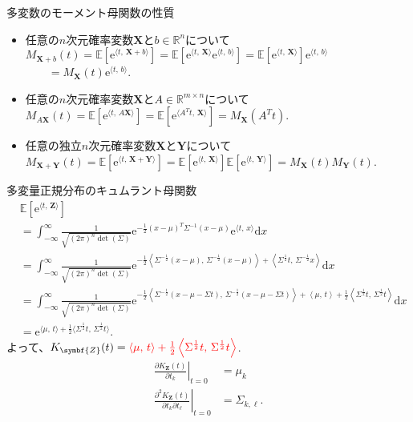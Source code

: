 \documentclass[lualatex,handout]{beamer}
\newcommand{\mycolor}[2]{%
  \begingroup
  \colorlet{currentcolor}{.}%
  \color{#1}#2%
  \color{currentcolor}%
  \endgroup
}
\newcommand{\emm}[1]{\mycolor{red}{#1}}
\newcommand{\expt}[1]{\mathbb{E}\left[#1\right]}
\theoremstyle{definition}
\begin{document}
\begin{frame}{多変数のモーメント母関数の性質}
\small
\begin{itemize}
\setlength{\itemsep}{3em}
\item 任意の$n$次元確率変数$\symbf{X}$と$b\in\mathbb{R}^n$について
$M_{{\symbf{X}}+b}(t) = \expt{\mathrm{e}^{\langle t,\, {\symbf{X}}+b\rangle}} = \expt{\mathrm{e}^{\langle t,\,\symbf{X}\rangle}\mathrm{e}^{\langle t,\,b\rangle}} = \expt{\mathrm{e}^{\langle t,\, {\symbf{X}}\rangle}}\mathrm{e}^{\langle t,\,b\rangle}$\\
$\qquad = M_{\symbf{X}}(t)\mathrm{e}^{\langle t,\, b\rangle}$.
\item 任意の$n$次元確率変数$\symbf{X}$と$A\in\mathbb{R}^{m\times n}$について
$M_{A{\symbf{X}}}(t) = \expt{\mathrm{e}^{\langle t,\, A{\symbf{X}}\rangle}} = \expt{\mathrm{e}^{\langle A^Tt,\, {\symbf{X}}\rangle}} = M_{\symbf{X}}(A^Tt)$.
\item 任意の独立$n$次元確率変数$\symbf{X}$と$\symbf{Y}$について
$M_{{\symbf{X}}+{\symbf{Y}}}(t) = \expt{\mathrm{e}^{\langle t,\, {\symbf{X}}+{\symbf{Y}}\rangle}} = \expt{\mathrm{e}^{\langle t,\, {\symbf{X}}\rangle}}\expt{\mathrm{e}^{\langle t,\, {\symbf{Y}}\rangle}}= M_{\symbf{X}}(t)M_{\symbf{Y}}(t)$.
\end{itemize}
\end{frame}

\begin{frame}{多変量正規分布のキュムラント母関数}
\small
\begin{align*}
&\expt{\mathrm{e}^{\langle t,\,\symbf{Z}\rangle}}\\
&=\int_{-\infty}^\infty \frac1{\sqrt{(2\pi)^n\det(\Sigma)}} \mathrm{e}^{-\frac12 (x-\mu)^T\Sigma^{-1} (x-\mu)}\mathrm{e}^{\langle t,\, x\rangle}\mathrm{d}x\\
&= \int_{-\infty}^\infty \frac1{\sqrt{(2\pi)^n\det(\Sigma)}} \mathrm{e}^{-\frac12 \left\langle\Sigma^{-\frac12}(x-\mu),\,\Sigma^{-\frac12}(x-\mu)\right\rangle+\left\langle \Sigma^{\frac12}t,\, \Sigma^{-\frac12}x\right\rangle}\mathrm{d}x\\
&= \int_{-\infty}^\infty \frac1{\sqrt{(2\pi)^n\det(\Sigma)}} \mathrm{e}^{-\frac12 \left\langle\Sigma^{-\frac12}(x-\mu-\Sigma t),\,\Sigma^{-\frac12}(x-\mu-\Sigma t)\right\rangle +\left\langle \mu,\, t\right\rangle + \frac12\left\langle \Sigma^\frac12t,\,\Sigma^\frac12t\right\rangle}\mathrm{d}x\\
&= \mathrm{e}^{\langle \mu,\, t\rangle + \frac12\langle \Sigma^\frac12t,\,\Sigma^\frac12t\rangle}.
\end{align*}
よって、$K_{\symbf{Z}}(t) = \emm{\langle \mu,\, t\rangle + \frac12\left\langle \Sigma^\frac12t,\,\Sigma^\frac12t\right\rangle}$.
\begin{align*}
\left.\frac{\partial K_{\symbf{Z}}(t)}{\partial t_k}\right|_{t=0} &= \mu_k\\
\left.\frac{\partial^2 K_{\symbf{Z}}(t)}{\partial t_k\partial t_\ell}\right|_{t=0} &= \Sigma_{k, \ell}.
\end{align*}
\end{frame}
\end{document}
